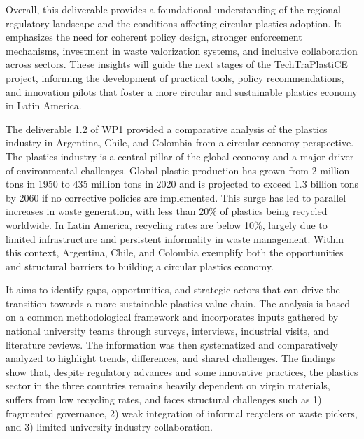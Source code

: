 \documentclass[
  12pt,
  oneside]{book}
\begin{document}
Overall, this deliverable provides a foundational understanding of the
regional regulatory landscape and the conditions affecting circular
plastics adoption. It emphasizes the need for coherent policy design,
stronger enforcement mechanisms, investment in waste valorization
systems, and inclusive collaboration across sectors. These insights will
guide the next stages of the TechTraPlastiCE project, informing the
development of practical tools, policy recommendations, and innovation
pilots that foster a more circular and sustainable plastics economy in
Latin America.

The deliverable 1.2 of WP1 provided a comparative analysis of the
plastics industry in Argentina, Chile, and Colombia from a circular
economy perspective. The plastics industry is a central pillar of the
global economy and a major driver of environmental challenges. Global
plastic production has grown from 2 million tons in 1950 to 435 million
tons in 2020 and is projected to exceed 1.3 billion tons by 2060 if no
corrective policies are implemented. This surge has led to parallel
increases in waste generation, with less than 20\% of plastics being
recycled worldwide. In Latin America, recycling rates are below 10\%,
largely due to limited infrastructure and persistent informality in
waste management. Within this context, Argentina, Chile, and Colombia
exemplify both the opportunities and structural barriers to building a
circular plastics economy.

It aims to identify gaps, opportunities, and strategic actors that can
drive the transition towards a more sustainable plastics value chain.
The analysis is based on a common methodological framework and
incorporates inputs gathered by national university teams through
surveys, interviews, industrial visits, and literature reviews. The
information was then systematized and comparatively analyzed to
highlight trends, differences, and shared challenges. The findings show
that, despite regulatory advances and some innovative practices, the
plastics sector in the three countries remains heavily dependent on
virgin materials, suffers from low recycling rates, and faces structural
challenges such as 1) fragmented governance, 2) weak integration of
informal recyclers or waste pickers, and 3) limited university-industry
collaboration.
\end{document}

